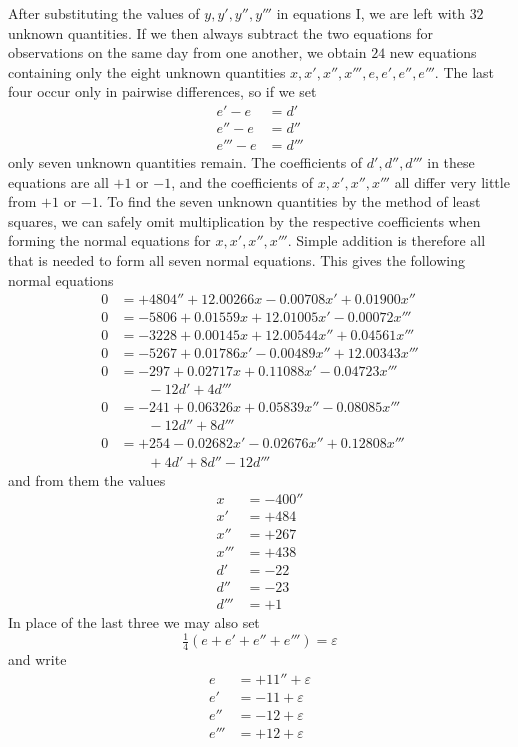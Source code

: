After substituting the values of $y,y',y'',y'''$ in equations I, we are left with $32$ unknown quantities. If we then always subtract the two equations for observations on the same day from one another, we obtain $24$ new equations containing only the eight unknown quantities $x,x',x'',x''',e,e',e'',e'''$. The last four occur only in pairwise differences, so if we set
\[
\begin{aligned}
e'-e&=d'\\
e''-e&=d''\\
e'''-e&=d'''
\end{aligned}
\]
only seven unknown quantities remain. The coefficients of $d',d'',d'''$ in these equations are all $+1$ or $-1$, and the coefficients of $x,x',x'',x'''$ all differ very little from $+1$ or $-1$. To find the seven unknown quantities by the method of least squares, we can safely omit multiplication by the respective coefficients when forming the normal equations for $x,x',x'',x'''$. Simple addition is therefore all that is needed to form all seven normal equations. This gives the following normal equations
\[
\begin{aligned}
0&=+4804''+12.00266x-0.00708x'+0.01900x''\\
0&=-5806+0.01559x+12.01005x'-0.00072x'''\\
0&=-3228+0.00145x+12.00544x''+0.04561x'''\\
0&=-5267+0.01786x'-0.00489x''+12.00343x'''\\
0&=-297+0.02717x+0.11088x'-0.04723x'''\\
 &\qquad-12d'+4d'''\\
0&=-241+0.06326x+0.05839x''-0.08085x'''\\
 &\qquad-12d''+8d'''\\
0&=+254-0.02682x'-0.02676x''+0.12808x'''\\
 &\qquad+4d'+8d''-12d'''
\end{aligned}
\]
and from them the values
\[
\begin{aligned}
x&=-400''\\
x'&=+484\\
x''&=+267\\
x'''&=+438\\
d'&=-22\\
d''&=-23\\
d'''&=+1
\end{aligned}
\]
In place of the last three we may also set
\[
\tfrac14(e+e'+e''+e''')=\varepsilon
\]
and write
\[
\begin{aligned}
e&=+11''+\varepsilon\\
e'&=-11+\varepsilon\\
e''&=-12+\varepsilon\\
e'''&=+12+\varepsilon
\end{aligned}
\]
